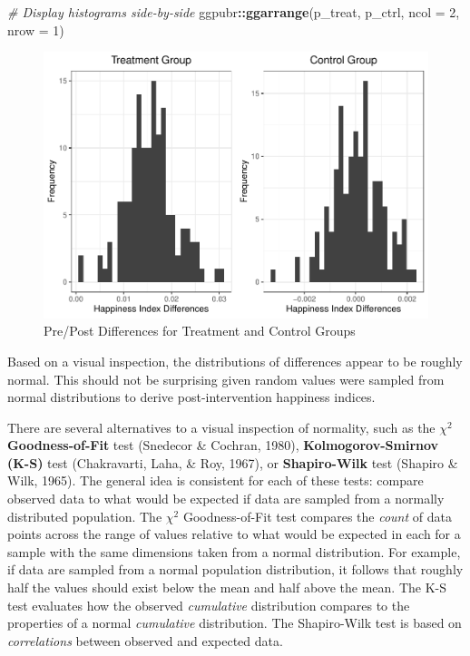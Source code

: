 \documentclass[]{book}
\newenvironment{Shaded}{\begin{snugshade}}{\end{snugshade}}
\newcommand{\CommentTok}[1]{\textcolor[rgb]{0.56,0.35,0.01}{\textit{#1}}}
\newcommand{\DataTypeTok}[1]{\textcolor[rgb]{0.13,0.29,0.53}{#1}}
\newcommand{\DecValTok}[1]{\textcolor[rgb]{0.00,0.00,0.81}{#1}}
\newcommand{\KeywordTok}[1]{\textcolor[rgb]{0.13,0.29,0.53}{\textbf{#1}}}
\newcommand{\NormalTok}[1]{#1}
\newcommand{\OperatorTok}[1]{\textcolor[rgb]{0.81,0.36,0.00}{\textbf{#1}}}
\begin{document}
\begin{Shaded}
\begin{Highlighting}[]
\CommentTok{# Display histograms side-by-side}
\NormalTok{ggpubr}\OperatorTok{::}\KeywordTok{ggarrange}\NormalTok{(p_treat, p_ctrl, }\DataTypeTok{ncol =} \DecValTok{2}\NormalTok{, }\DataTypeTok{nrow =} \DecValTok{1}\NormalTok{)}
\end{Highlighting}
\end{Shaded}

\begin{figure}

{\centering \includegraphics{People_Analytics_Lifecycle_files/figure-latex/pre-post-diff-1} 

}

\caption{Pre/Post Differences for Treatment and Control Groups}\label{fig:pre-post-diff}
\end{figure}

Based on a visual inspection, the distributions of differences appear to be roughly normal. This should not be surprising given random values were sampled from normal distributions to derive post-intervention happiness indices.

There are several alternatives to a visual inspection of normality, such as the \({\chi}^2\) \textbf{Goodness-of-Fit} test (Snedecor \& Cochran, 1980), \textbf{Kolmogorov-Smirnov (K-S)} test (Chakravarti, Laha, \& Roy, 1967), or \textbf{Shapiro-Wilk} test (Shapiro \& Wilk, 1965). The general idea is consistent for each of these tests: compare observed data to what would be expected if data are sampled from a normally distributed population. The \({\chi}^2\) Goodness-of-Fit test compares the \emph{count} of data points across the range of values relative to what would be expected in each for a sample with the same dimensions taken from a normal distribution. For example, if data are sampled from a normal population distribution, it follows that roughly half the values should exist below the mean and half above the mean. The K-S test evaluates how the observed \emph{cumulative} distribution compares to the properties of a normal \emph{cumulative} distribution. The Shapiro-Wilk test is based on \emph{correlations} between observed and expected data.
\end{document}
